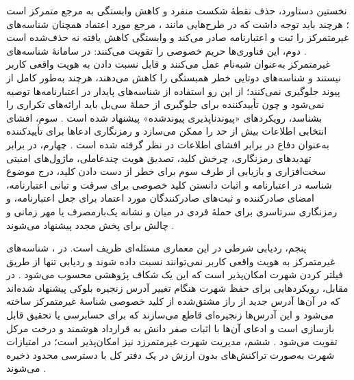 \documentclass[12pt,a4paper]{article}
\begin{document}
نخستین دستاورد، حذف نقطهٔ شکست منفرد و کاهش وابستگی به مرجع متمرکز است \cite{mazzocca2025survey}؛ هرچند باید توجه داشت که در طرح‌هایی مانند ، مرجع مورد اعتماد همچنان شناسه‌های غیرمتمرکز را ثبت و اعتبارنامه صادر می‌کند و وابستگی کاهش یافته نه حذف‌شده است \cite{feraudoDIVADIDbasedReputation2024}. دوم، این فناوری‌ها حریم خصوصی را تقویت می‌کنند: در سامانهٔ  شناسه‌های غیرمتمرکز به‌عنوان شبه‌نام عمل می‌کنند و قابل نسبت دادن به هویت واقعی کاربر نیستند \cite{feraudoDIVADIDbasedReputation2024} و شناسه‌های دوتایی خطر همبستگی را کاهش می‌دهند، هرچند به‌طور کامل از پیوند جلوگیری نمی‌کنند؛ از این رو استفاده از شناسه‌های پایدار در اعتبارنامه‌ها توصیه نمی‌شود و چون تأییدکننده برای جلوگیری از حملهٔ سی‌بل باید ارائه‌های تکراری را بشناسد، رویکرد‌های «پیوندناپذیری پیوندشده» پیشنهاد شده است \cite{mazzocca2025survey}. سوم، افشای انتخابی اطلاعات بیش از حد را ممکن می‌سازد و رمزنگاری ادعا‌ها برای تأییدکننده به‌عنوان دفاع در برابر افشای اطلاعات در نظر گرفته شده است \cite{mazzocca2025survey}. چهارم، در برابر تهدید‌های رمزنگاری، چرخش کلید، تصدیق هویت چندعاملی، ماژول‌های امنیتی سخت‌افزاری و بازیابی از طرف سوم برای خطر از دست دادن کلید، درج موضوع شناسه در اعتبارنامه و اثبات دانستن کلید خصوصی برای سرقت و تبانی اعتبارنامه، امضای صادرکننده و ثبت‌های صادرکنندگان مورد اعتماد برای جعل اعتبارنامه، و رمزنگاری سرتاسری برای حملهٔ فردی در میان و نشانه یک‌بارمصرف یا مهر زمانی و چالش برای پخش مجدد پیشنهاد می‌شوند \cite{mazzocca2025survey}.

پنجم، ردیابی شرطی در این معماری مسئله‌ای ظریف است. در ، شناسه‌های غیرمتمرکز به هویت واقعی کاربر نمی‌توانند نسبت داده شوند و ردیابی تنها از طریق فیلتر کردن شهرت امکان‌پذیر است که این یک شکاف پژوهشی محسوب می‌شود \cite{feraudoDIVADIDbasedReputation2024}. در مقابل، رویکرد‌هایی برای حفظ شهرت هنگام تغییر آدرس زنجیره بلوکی پیشنهاد شده‌اند که در آن‌ها آدرس جدید از راز مشتق‌شده از کلید خصوصی شناسهٔ غیرمتمرکز ساخته می‌شود و این آدرس‌ها زنجیره‌ای قاطع می‌سازند که برای حسابرسی یا تحقیق قابل بازسازی است و ادعای آن‌ها با اثبات صفر دانش به قرارداد هوشمند و درخت مرکل تقویت می‌شود \cite{mazzocca2025survey}. ششم، مدیریت شهرت غیرمتمرزد نیز امکان‌پذیر است؛ در  امتیازات شهرت به‌صورت تراکنش‌های بدون ارزش در یک دفتر کل با دسترسی محدود ذخیره می‌شوند \cite{feraudoDIVADIDbasedReputation2024}.
\end{document}
